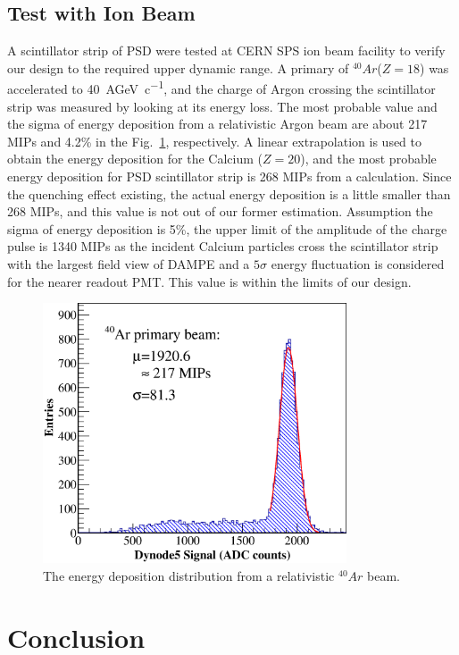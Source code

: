 \documentclass[5p, times]{elsarticle}
\begin{document}
\subsection{Test with Ion Beam}
\label{sec:beam}

A scintillator strip of PSD were tested at CERN SPS ion beam facility to verify our design to the required upper dynamic range. 
A primary of $^{40}Ar$($Z=18$) was accelerated to \SI{40}{AGeV\per c}, and the charge of Argon crossing the scintillator strip was measured by looking at its energy loss. 
The most probable value and the sigma of energy deposition from a relativistic Argon beam are about 217 MIPs and 4.2\% in the Fig.~\ref{fig:Ar}, respectively. 
A linear extrapolation is used to obtain the energy deposition for the Calcium ($Z=20$), and the most probable energy deposition for PSD scintillator strip is 268 MIPs from a calculation. 
Since the quenching effect existing, the actual energy deposition is a little smaller than 268 MIPs, and this value is not out of our former estimation. 
Assumption the sigma of energy deposition is 5\%, the upper limit of the amplitude of the charge pulse is 1340 MIPs as the incident Calcium particles cross the scintillator strip with the largest field view of DAMPE and a $5\sigma$ energy fluctuation is considered for the nearer readout PMT. 
This value is within the limits of our design.

\begin{figure}
 \centering
 \includegraphics[width=90mm]{Ar}
\caption{The energy deposition distribution from a relativistic $^{40}Ar$ beam.}
\label{fig:Ar}
\end{figure} 

\section{Conclusion}
\label{sec:conclustion}
\end{document}
